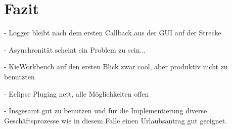 \section{Fazit}
- Logger bleibt nach dem ersten Callback aus der GUI auf der Strecke

- Asynchronität scheint ein Problem zu sein...

- KieWorkbench auf den ersten Blick zwar cool, aber produktiv nicht zu benutzten

- Eclipse Pluging nett, alle Möglichkeiten offen

- Insgesamt gut zu benutzen und für die Implementierung diverse Geschäftsprozesse wie in diesem Falle einen Urlaubsantrag gut geeignet.
